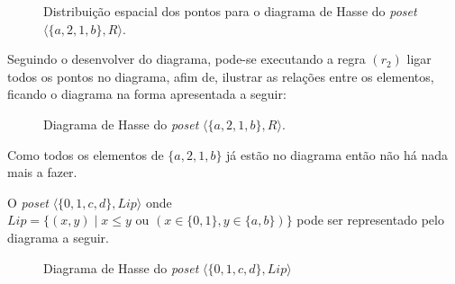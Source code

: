 \begin{figure}[h]
  \centering
  \caption{Distribuição espacial dos pontos para o diagrama de Hasse do \textit{poset} $\langle \{a, 2, 1, b\}, R \rangle$.}
  \label{fig:PreDiagramaHasse}
\end{figure}

Seguindo o desenvolver do diagrama, pode-se executando a regra $(r_2)$ ligar todos os pontos no diagrama, afim de, ilustrar as relações entre os elementos, ficando o diagrama na forma apresentada a seguir:

\begin{figure}[h]
  \centering
  \caption{Diagrama de Hasse do \textit{poset} $\langle \{a, 2, 1, b\}, R \rangle$.}
  \label{fig:DiagramaHasse1}
\end{figure}

Como todos os elementos de $\{a, 2, 1, b\}$ já estão no diagrama então não há nada mais a fazer.

\begin{exemplo}
	O \textit{poset} $\langle \{0, 1, c, d\}, Lip \rangle$ onde $Lip = \{(x, y) \mid x \leq y \text{ ou } (x \in \{0, 1\}, y \in \{a,b\}) \}$ pode ser representado pelo diagrama a seguir.
\end{exemplo}

\begin{figure}[h]
  \centering
  \caption{Diagrama de Hasse do \textit{poset} $\langle \{0, 1, c, d\}, Lip \rangle$}
  \label{fig:DiagramaHasse2}
\end{figure}

